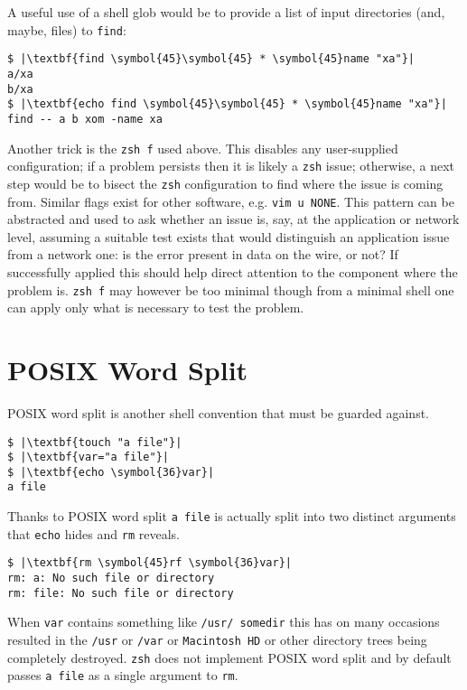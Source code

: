 \documentclass[10pt,a4paper]{article}
\begin{document}
A useful use of a shell glob would be to provide a list of input
directories (and, maybe, files) to \texttt{find}:

\begin{lstlisting}
$ |\textbf{find \symbol{45}\symbol{45} * \symbol{45}name "xa"}|
a/xa
b/xa
$ |\textbf{echo find \symbol{45}\symbol{45} * \symbol{45}name "xa"}|
find -- a b xom -name xa
\end{lstlisting}

Another trick is the \texttt{zsh f} used above. This
disables any user-supplied configuration; if a problem persists then it
is likely a \texttt{zsh} issue; otherwise, a next step would be to
bisect the \texttt{zsh} configuration to find where the issue is coming
from. Similar flags exist for other software, e.g. \texttt{vim
u NONE}. This pattern can be abstracted and used to ask
whether an issue is, say, at the application or network level, assuming
a suitable test exists that would distinguish an application issue from
a network one: is the error present in data on the wire, or not? If
successfully applied this should help direct attention to the component
where the problem is. \texttt{zsh f} may however be too
minimal though from a minimal shell one can apply only what is
necessary to test the problem.

\clearpage
\section*{POSIX Word Split}

POSIX word split is another shell convention that must be guarded against.

\begin{lstlisting}
$ |\textbf{touch "a file"}|
$ |\textbf{var="a file"}|
$ |\textbf{echo \symbol{36}var}|
a file
\end{lstlisting}

Thanks to POSIX word split \texttt{a file} is actually split into two distinct
arguments that \texttt{echo} hides and \texttt{rm} reveals.

\begin{lstlisting}
$ |\textbf{rm \symbol{45}rf \symbol{36}var}|
rm: a: No such file or directory
rm: file: No such file or directory
\end{lstlisting}

When \texttt{var} contains something like \texttt{/usr/
somedir} this has on many occasions resulted in the \texttt{/usr} or
\texttt{/var} or \texttt{Macintosh HD} or other directory trees being
completely destroyed. \texttt{zsh} does not implement POSIX word split
and by default passes \texttt{a file} as a single argument to
\texttt{rm}.
\end{document}
